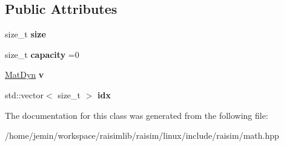 \subsection*{Public Attributes}
\begin{DoxyCompactItemize}
\item 
\mbox{\label{classraisim_1_1SparseJacobian_af5f3a66fbf8ff46ddc0326943dff9551}} 
size\+\_\+t {\bfseries size}
\item 
\mbox{\label{classraisim_1_1SparseJacobian_a3315bbc715fa5f88571f20377ff0933b}} 
size\+\_\+t {\bfseries capacity} =0
\item 
\mbox{\label{classraisim_1_1SparseJacobian_a15359d2e8d5ddba84a4f21f0eb86a57f}} 
\hyperlink{classraisim_1_1MatDyn}{Mat\+Dyn} {\bfseries v}
\item 
\mbox{\label{classraisim_1_1SparseJacobian_a104f7691146db5e6b570a97bfce3c87e}} 
std\+::vector$<$ size\+\_\+t $>$ {\bfseries idx}
\end{DoxyCompactItemize}


The documentation for this class was generated from the following file\+:\begin{DoxyCompactItemize}
\item 
/home/jemin/workspace/raisimlib/raisim/linux/include/raisim/math.\+hpp\end{DoxyCompactItemize}
